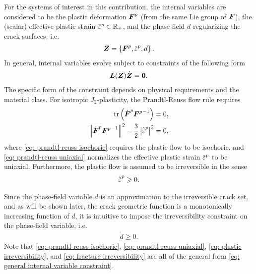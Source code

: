For the systems of interest in this contribution, the internal variables are considered to be the plastic deformation $\boldsymbol{F}^p$ (from the same Lie group of $\boldsymbol{F}$), the (scalar) effective plastic strain $\ep \in \mathbb{R}_+$, and the phase-field $d$ regularizing the crack surfaces, i.e.
\begin{align}
  \bfZ = \left\{ \bfF^p, \ep, d \right\}.
\end{align}
In general, internal variables evolve subject to constraints of the following form
\begin{align}
  \boldsymbol{L}(\boldsymbol{Z})\dot{\boldsymbol{Z}} = \boldsymbol{0}. \label{eq: general internal variable constraint}
\end{align}
The specific form of the constraint depends on physical requirements and the material class. For isotropic $J_2$-plasticity, the Prandtl-Reuss flow rule requires
\begin{subequations}
  \begin{align}
    \tr\left( \dot{\bfF}^p {\bfF^p}^{-1} \right)                     & = 0, \label{eq: prandtl-reuss isochoric} \\
    \norm{\dot{\bfF}^p {\bfF^p}^{-1}}^2 - \dfrac{3}{2}\abs{\epdot}^2 & = 0, \label{eq: prandtl-reuss uniaxial}
  \end{align}
\end{subequations}
where \eqref{eq: prandtl-reuss isochoric} requires the plastic flow to be isochoric, and \eqref{eq: prandtl-reuss uniaxial} normalizes the effective plastic strain $\ep$ to be uniaxial. Furthermore, the plastic flow is assumed to be irreversible in the sense
\begin{align}
  \epdot \geqslant 0. \label{eq: plastic irreversibility}
\end{align}

Since the phase-field variable $d$ is an approximation to the irreversible crack set, and as will be shown later, the crack geometric function is a monotonically increasing function of $d$, it is intuitive to impose the irreversibility constraint on the phase-field variable, i.e.
\begin{align}
  \dot{d} \geqslant 0. \label{eq: fracture irreversibility}
\end{align}
Note that \eqref{eq: prandtl-reuss isochoric}, \eqref{eq: prandtl-reuss uniaxial}, \eqref{eq: plastic irreversibility}, and \eqref{eq: fracture irreversibility} are all of the general form \eqref{eq: general internal variable constraint}.
